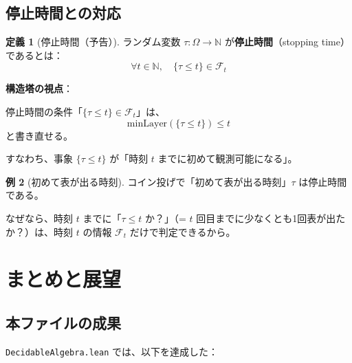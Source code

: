 \documentclass[12pt,a4paper,ja=standard]{bxjsarticle}
\theoremstyle{definition}
\newtheorem{definition}{定義}[section]
\newtheorem{example}[definition]{例}
\begin{document}
\subsection{停止時間との対応}

\begin{definition}[停止時間（予告）]
ランダム変数 $\tau : \Omega \to \mathbb{N}$ が\textbf{停止時間}（stopping time）であるとは：
\[
\forall t \in \mathbb{N}, \quad \{\tau \leq t\} \in \mathcal{F}_t
\]
\end{definition}

\begin{connection}
\textbf{構造塔の視点}：

停止時間の条件「$\{\tau \leq t\} \in \mathcal{F}_t$」は、
\[
\mathrm{minLayer}(\{\tau \leq t\}) \leq t
\]
と書き直せる。

すなわち、事象 $\{\tau \leq t\}$ が「時刻 $t$ までに初めて観測可能になる」。
\end{connection}

\begin{example}[初めて表が出る時刻]
コイン投げで「初めて表が出る時刻」$\tau$ は停止時間である。

なぜなら、時刻 $t$ までに「$\tau \leq t$ か？」（= $t$ 回目までに少なくとも1回表が出たか？）は、時刻 $t$ の情報 $\mathcal{F}_t$ だけで判定できるから。
\end{example}

\section{まとめと展望}\label{sec:conclusion}

\subsection{本ファイルの成果}

\texttt{DecidableAlgebra.lean} では、以下を達成した：
\end{document}
